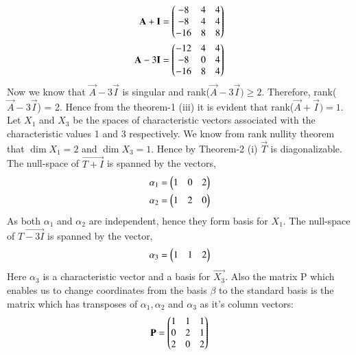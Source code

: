 \begin{align}
\mathbf{A} + \mathbf{I} = \begin{pmatrix}-8&4&4\\-8&4&4\\-16&8&8\end{pmatrix}\\
\mathbf{A} - 3\mathbf{I} = \begin{pmatrix}-12&4&4\\-8&0&4\\-16&8&4\end{pmatrix}
\end{align}
Now we know that $\vec{A}-3\vec{I}$ is singular and rank($\vec{A}-3\vec{I})\geq 2.$ Therefore, rank($\vec{A}-3\vec{I}$) = 2. Hence from the theorem-1 (iii) it is evident that rank($\vec{A}+\vec{I}) = 1$. Let $X_1$ and $X_3$ be the spaces of characteristic vectors associated with the characteristic values 1 and 3 respectively. We know from rank nullity theorem that $\dim X_1 = 2$ and $\dim X_3 = 1$. Hence by Theorem-2 (i) $\vec{T}$ is diagonalizable. \\
The null-space of $\vec{T+I}$ is spanned by the vectors,
\begin{align}
\alpha_1 = \begin{pmatrix}1&0&2\end{pmatrix}\\
\alpha_2 = \begin{pmatrix}1&2&0\end{pmatrix}
\end{align}
As both $\alpha_1$ and $\alpha_2$ are independent, hence they form basis for $X_1$. The null-space of $\vec{T-3I}$ is spanned by the vector,
\begin{align}
\alpha_3 = \begin{pmatrix}1&1&2\end{pmatrix}
\end{align}
Here $\alpha_3$ is a characteristic vector and a basis for $\vec{X_3}$.
Also the matrix P which enables us to change coordinates from the basis $\beta$ to the standard basis is the matrix which has transposes of $\alpha_1, \alpha_2 $ and $\alpha_3$ as it's column vectors:
\begin{align}
\mathbf{P} = \begin{pmatrix}1&1&1\\0&2&1\\2&0&2\end{pmatrix}
\end{align} 

